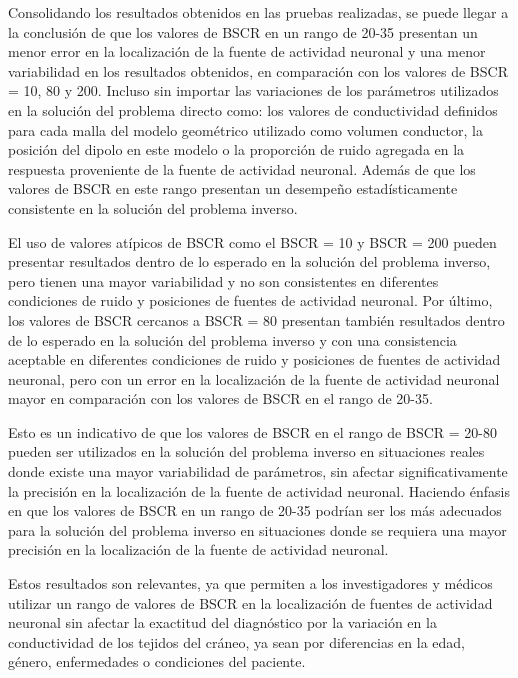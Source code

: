Consolidando los resultados obtenidos en las pruebas realizadas, se puede llegar a la conclusión de que los valores de BSCR en un rango de 20-35 presentan un menor error en la localización de la fuente de actividad neuronal y una menor variabilidad en los resultados obtenidos, en comparación con los valores de BSCR = 10, 80 y 200.
Incluso sin importar las variaciones de los parámetros utilizados en la solución del problema directo como: los valores de conductividad definidos para cada malla del modelo geométrico utilizado como volumen conductor, la posición del dipolo en este modelo o la proporción de ruido agregada en la respuesta proveniente de la fuente de actividad neuronal.
Además de que los valores de BSCR en este rango presentan un desempeño estadísticamente consistente en la solución del problema inverso.

El uso de valores atípicos de BSCR como el BSCR = 10 y BSCR = 200 pueden presentar resultados dentro de lo esperado en la solución del problema inverso, pero tienen una mayor variabilidad y no son consistentes en diferentes condiciones de ruido y posiciones de fuentes de actividad neuronal.
Por último, los valores de BSCR cercanos a BSCR = 80 presentan también resultados dentro de lo esperado en la solución del problema inverso y con una consistencia aceptable en diferentes condiciones de ruido y posiciones de fuentes de actividad neuronal, pero con un error en la localización de la fuente de actividad neuronal mayor en comparación con los valores de BSCR en el rango de 20-35.

Esto es un indicativo de que los valores de BSCR en el rango de BSCR = 20-80 pueden ser utilizados en la solución del problema inverso en situaciones reales donde existe una mayor variabilidad de parámetros, sin afectar significativamente la precisión en la localización de la fuente de actividad neuronal. 
Haciendo énfasis en que los valores de BSCR en un rango de 20-35 podrían ser los más adecuados para la solución del problema inverso en situaciones donde se requiera una mayor precisión en la localización de la fuente de actividad neuronal.

Estos resultados son relevantes, ya que permiten a los investigadores y médicos utilizar un rango de valores de BSCR en la localización de fuentes de actividad neuronal sin afectar la exactitud del diagnóstico por la variación en la conductividad de los tejidos del cráneo, ya sean por diferencias en la edad, género, enfermedades o condiciones del paciente.